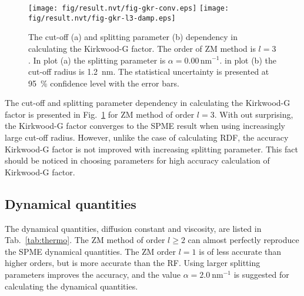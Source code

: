\documentclass[aip,jcp,a4paper,preprint,unsortedaddress,onecolumn,fleqn]{revtex4-1}
\begin{document}
\begin{figure}
  \centering
  \texttt{[image: fig/result.nvt/fig-gkr-conv.eps]}
  \texttt{[image: fig/result.nvt/fig-gkr-l3-damp.eps]} 
  \caption{
    The cut-off (a) and splitting parameter (b) dependency in calculating the Kirkwood-G factor.
    The order of ZM method is $l=3$. In plot (a) the splitting parameter is $\alpha = 0.00\,\textrm{nm}^{-1}$.
    in plot (b) the cut-off radius is 1.2~nm.
    The statistical uncertainty is presented at 95~\% confidence level with the  error bars.
  }
  \label{fig:gkr-conv}
\end{figure}

The cut-off and splitting parameter dependency in calculating the Kirkwood-G factor
is presented in Fig.~\ref{fig:gkr-conv}  for ZM method of order $l=3$. With out surprising,
the Kirkwood-G factor converges to the SPME result when using increasingly large cut-off radius. 
However, unlike the case of calculating RDF, the accuracy Kirkwood-G factor is not improved
with increasing splitting parameter. This fact should be noticed in choosing parameters for
high accuracy calculation of Kirkwood-G factor.

\subsection{Dynamical quantities}

The dynamical quantities, diffusion constant and viscosity, are listed in Tab.~\ref{tab:thermo}.
The ZM method of order $l\geq 2$ can almost perfectly reproduce the SPME dynamical quantities.
The ZM order $l=1$ is of less accurate than higher orders, but is more accurate than the RF.
Using larger splitting parameters improves the accuracy, and the value $\alpha= 2.0\ \textrm{nm}^{-1}$ is
suggested for calculating the dynamical quantities.


\end{document}
